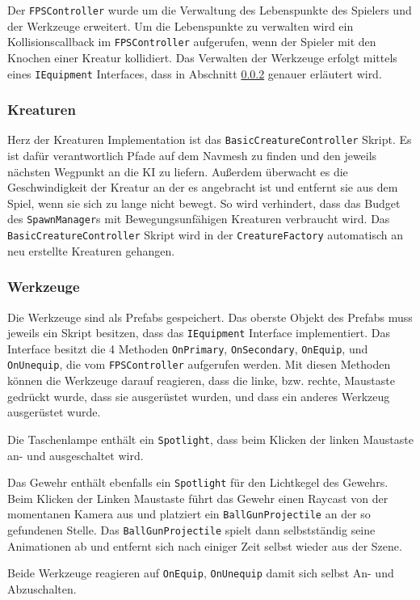 Der \texttt{FPSController} wurde um die Verwaltung des Lebenspunkte des Spielers und der Werkzeuge erweitert.
Um die Lebenspunkte zu verwalten wird ein Kollisionscallback im \texttt{FPSController} aufgerufen, wenn der Spieler mit den Knochen einer Kreatur kollidiert.
Das Verwalten der Werkzeuge erfolgt mittels eines \texttt{IEquipment} Interfaces, dass in Abschnitt \ref{sec:design-tools} genauer erläutert wird.

\subsubsection{Kreaturen}
Herz der Kreaturen Implementation ist das \texttt{BasicCreatureController} Skript.
Es ist dafür verantwortlich Pfade auf dem Navmesh zu finden und den jeweils nächsten Wegpunkt an die KI zu liefern.
Außerdem überwacht es die Geschwindigkeit der Kreatur an der es angebracht ist und entfernt sie aus dem Spiel, wenn sie sich zu lange nicht bewegt.
So wird verhindert, dass das Budget des \texttt{SpawnManager}s mit Bewegungsunfähigen Kreaturen verbraucht wird.
Das \texttt{BasicCreatureController} Skript wird in der \texttt{CreatureFactory} automatisch an neu erstellte Kreaturen gehangen.

\subsubsection{Werkzeuge}
\label{sec:design-tools}
Die Werkzeuge sind als Prefabs gespeichert.
Das oberste Objekt des Prefabs muss jeweils ein Skript besitzen, dass das \texttt{IEquipment} Interface implementiert.
Das Interface besitzt die 4 Methoden \texttt{OnPrimary}, \texttt{OnSecondary}, \texttt{OnEquip}, und \texttt{OnUnequip}, die vom \texttt{FPSController} aufgerufen werden.
Mit diesen Methoden können die Werkzeuge darauf reagieren, dass die linke, bzw. rechte, Maustaste gedrückt wurde, dass sie ausgerüstet wurden, und dass ein anderes Werkzeug ausgerüstet wurde.

Die Taschenlampe enthält ein \texttt{Spotlight}, dass beim Klicken der linken Maustaste an- und ausgeschaltet wird.

Das Gewehr enthält ebenfalls ein \texttt{Spotlight} für den Lichtkegel des Gewehrs.
Beim Klicken der Linken Maustaste führt das Gewehr einen Raycast von der momentanen Kamera aus und platziert ein \texttt{BallGunProjectile} an der so gefundenen Stelle.
Das \texttt{BallGunProjectile} spielt dann selbstständig seine Animationen ab und entfernt sich nach einiger Zeit selbst wieder aus der Szene.

Beide Werkzeuge reagieren auf \texttt{OnEquip}, \texttt{OnUnequip} damit sich selbst An- und Abzuschalten.